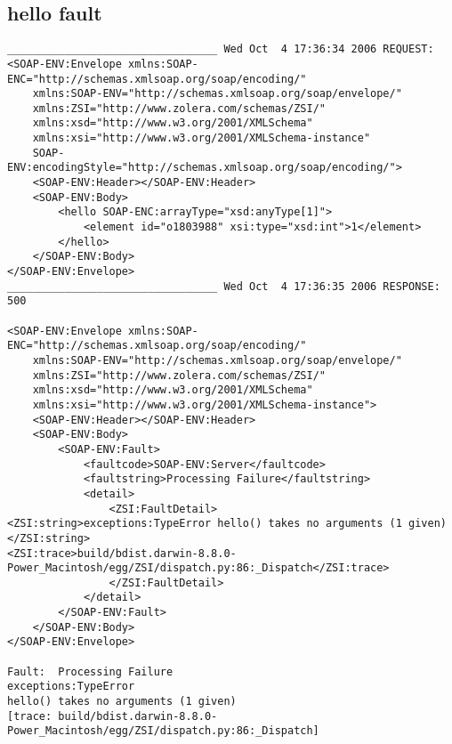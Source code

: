 \subsection{hello fault}
\begin{verbatim}
_________________________________ Wed Oct  4 17:36:34 2006 REQUEST:
<SOAP-ENV:Envelope xmlns:SOAP-ENC="http://schemas.xmlsoap.org/soap/encoding/"
	xmlns:SOAP-ENV="http://schemas.xmlsoap.org/soap/envelope/"
	xmlns:ZSI="http://www.zolera.com/schemas/ZSI/"
	xmlns:xsd="http://www.w3.org/2001/XMLSchema"
	xmlns:xsi="http://www.w3.org/2001/XMLSchema-instance"
	SOAP-ENV:encodingStyle="http://schemas.xmlsoap.org/soap/encoding/">
	<SOAP-ENV:Header></SOAP-ENV:Header>
	<SOAP-ENV:Body>
		<hello SOAP-ENC:arrayType="xsd:anyType[1]">
			<element id="o1803988" xsi:type="xsd:int">1</element>
		</hello>
	</SOAP-ENV:Body>
</SOAP-ENV:Envelope>
_________________________________ Wed Oct  4 17:36:35 2006 RESPONSE:
500

<SOAP-ENV:Envelope xmlns:SOAP-ENC="http://schemas.xmlsoap.org/soap/encoding/"
	xmlns:SOAP-ENV="http://schemas.xmlsoap.org/soap/envelope/"
	xmlns:ZSI="http://www.zolera.com/schemas/ZSI/"
	xmlns:xsd="http://www.w3.org/2001/XMLSchema"
	xmlns:xsi="http://www.w3.org/2001/XMLSchema-instance">
	<SOAP-ENV:Header></SOAP-ENV:Header>
	<SOAP-ENV:Body>
		<SOAP-ENV:Fault>
			<faultcode>SOAP-ENV:Server</faultcode>
			<faultstring>Processing Failure</faultstring>
			<detail>
				<ZSI:FaultDetail>
<ZSI:string>exceptions:TypeError hello() takes no arguments (1 given)</ZSI:string>
<ZSI:trace>build/bdist.darwin-8.8.0-Power_Macintosh/egg/ZSI/dispatch.py:86:_Dispatch</ZSI:trace>
				</ZSI:FaultDetail>
			</detail>
		</SOAP-ENV:Fault>
	</SOAP-ENV:Body>
</SOAP-ENV:Envelope>

Fault:  Processing Failure
exceptions:TypeError
hello() takes no arguments (1 given)
[trace: build/bdist.darwin-8.8.0-Power_Macintosh/egg/ZSI/dispatch.py:86:_Dispatch]
\end{verbatim}

